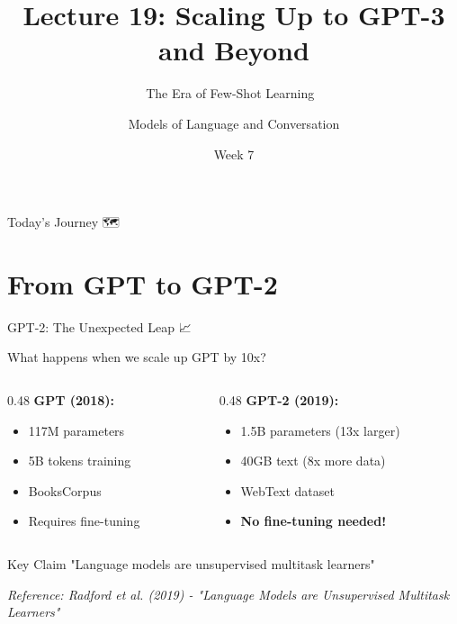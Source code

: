 \documentclass[aspectratio=169]{beamer}
\title{Lecture 19: Scaling Up to GPT-3 and Beyond}
\subtitle{The Era of Few-Shot Learning 🚀}
\author{Models of Language and Conversation}
\institute{Dr. Jeremy R. Manning}
\date{Week 7}
\begin{document}
\begin{frame}
    \titlepage
\end{frame}

\begin{frame}{Today's Journey 🗺️}
    \tableofcontents
\end{frame}

\section{From GPT to GPT-2}

\begin{frame}[shrink=10]{GPT-2: The Unexpected Leap 📈}
    \begin{discussion}
        What happens when we scale up GPT by 10x?
    \end{discussion}

    \vspace{0.3cm}

    \begin{columns}[T]
        \begin{column}{0.48\textwidth}
            \textbf{GPT (2018):}
            \begin{itemize}\setlength{\itemsep}{0pt}
                \item 117M parameters
                \item 5B tokens training
                \item BooksCorpus
                \item Requires fine-tuning
            \end{itemize}
        \end{column}

        \begin{column}{0.48\textwidth}
            \textbf{GPT-2 (2019):}
            \begin{itemize}\setlength{\itemsep}{0pt}
                \item 1.5B parameters (13x larger)
                \item 40GB text (8x more data)
                \item WebText dataset
                \item \textbf{No fine-tuning needed!}
            \end{itemize}
        \end{column}
    \end{columns}

    \vspace{0.3cm}

    \begin{alertblock}{Key Claim}
        "Language models are unsupervised multitask learners"
    \end{alertblock}

    \vspace{0.3cm}

    \small
    \textit{Reference: Radford et al. (2019) - "Language Models are Unsupervised Multitask Learners"}
\end{frame}
\end{document}
